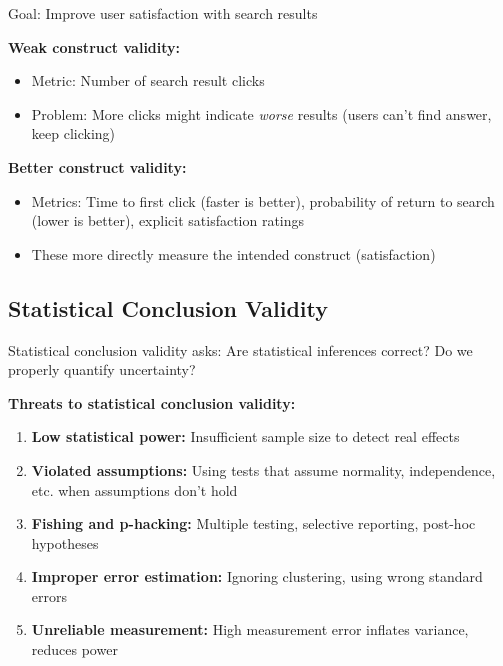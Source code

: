\begin{example}
Goal: Improve user satisfaction with search results

\textbf{Weak construct validity:}
\begin{itemize}
    \item Metric: Number of search result clicks
    \item Problem: More clicks might indicate \textit{worse} results (users can't find answer, keep clicking)
\end{itemize}

\textbf{Better construct validity:}
\begin{itemize}
    \item Metrics: Time to first click (faster is better), probability of return to search (lower is better), explicit satisfaction ratings
    \item These more directly measure the intended construct (satisfaction)
\end{itemize}
\end{example}

\subsection{Statistical Conclusion Validity}

Statistical conclusion validity asks: Are statistical inferences correct? Do we properly quantify uncertainty?

\textbf{Threats to statistical conclusion validity:}

\begin{enumerate}
    \item \textbf{Low statistical power:} Insufficient sample size to detect real effects

    \item \textbf{Violated assumptions:} Using tests that assume normality, independence, etc. when assumptions don't hold

    \item \textbf{Fishing and p-hacking:} Multiple testing, selective reporting, post-hoc hypotheses

    \item \textbf{Improper error estimation:} Ignoring clustering, using wrong standard errors

    \item \textbf{Unreliable measurement:} High measurement error inflates variance, reduces power
\end{enumerate}

